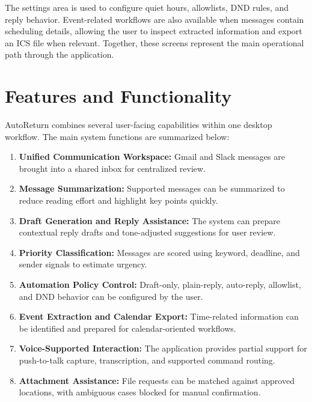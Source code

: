 The settings area is used to configure quiet hours, allowlists, DND rules, and reply behavior. Event-related workflows are also available when messages contain scheduling details, allowing the user to inspect extracted information and export an ICS file when relevant. Together, these screens represent the main operational path through the application.

\section{Features and Functionality}
AutoReturn combines several user-facing capabilities within one desktop workflow. The main system functions are summarized below:

\begin{enumerate}
    \item \textbf{Unified Communication Workspace:} Gmail and Slack messages are brought into a shared inbox for centralized review.
    \item \textbf{Message Summarization:} Supported messages can be summarized to reduce reading effort and highlight key points quickly.
    \item \textbf{Draft Generation and Reply Assistance:} The system can prepare contextual reply drafts and tone-adjusted suggestions for user review.
    \item \textbf{Priority Classification:} Messages are scored using keyword, deadline, and sender signals to estimate urgency.
    \item \textbf{Automation Policy Control:} Draft-only, plain-reply, auto-reply, allowlist, and DND behavior can be configured by the user.
    \item \textbf{Event Extraction and Calendar Export:} Time-related information can be identified and prepared for calendar-oriented workflows.
    \item \textbf{Voice-Supported Interaction:} The application provides partial support for push-to-talk capture, transcription, and supported command routing.
    \item \textbf{Attachment Assistance:} File requests can be matched against approved locations, with ambiguous cases blocked for manual confirmation.
\end{enumerate}

